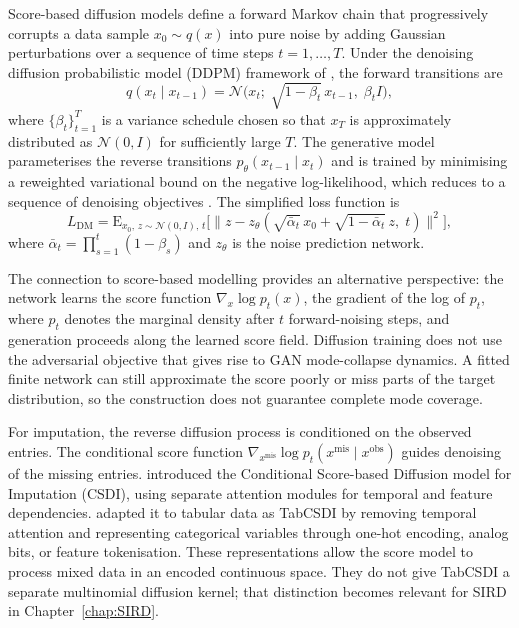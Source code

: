 Score-based diffusion models \citep{sohl-dickstein2015deep, song2020score} define a forward Markov chain that progressively corrupts a data sample $x_0 \sim q(x)$ into pure noise by adding Gaussian perturbations over a sequence of time steps $t = 1, \ldots, T$. Under the denoising diffusion probabilistic model (DDPM) framework of \citet{ho2020denoising}, the forward transitions are
\begin{equation}
    q(x_t \mid x_{t-1})
    = \mathcal{N}\bigl(x_t;\; \sqrt{1 - \beta_t}\, x_{t-1},\;
      \beta_t I\bigr),
    \label{eq:ddpm_forward}
\end{equation}
where $\{\beta_t\}_{t=1}^T$ is a variance schedule chosen so that $x_T$ is approximately distributed as $\mathcal{N}(0, I)$ for sufficiently large $T$. The generative model parameterises the reverse transitions $p_{\theta}(x_{t-1} \mid x_t)$ and is trained by minimising a reweighted variational bound on the negative log-likelihood, which reduces to a sequence of denoising objectives \citep{ho2020denoising}. The simplified loss function is
\begin{equation}
    L_{\mathrm{DM}}
    = \mathrm{E}_{x_0,\, z \sim \mathcal{N}(0,I),\, t}
    \bigl[\lVert z - z_{\theta}(\sqrt{\bar{\alpha}_t}\, x_0
    + \sqrt{1 - \bar{\alpha}_t}\, z,\; t) \rVert^2\bigr],
    \label{eq:ddpm_loss}
\end{equation}
where $\bar{\alpha}_t = \prod_{s=1}^{t}(1 - \beta_s)$ and $z_{\theta}$ is the noise prediction network.

The connection to score-based modelling \citep{song2019generative, song2020score} provides an alternative perspective: the network learns the score function $\nabla_x \log p_t(x)$, the gradient of the log of $p_t$, where $p_t$ denotes the marginal density after $t$ forward-noising steps, and generation proceeds along the learned score field. Diffusion training does not use the adversarial objective that gives rise to GAN mode-collapse dynamics. A fitted finite network can still approximate the score poorly or miss parts of the target distribution, so the construction does not guarantee complete mode coverage.

For imputation, the reverse diffusion process is conditioned on the observed entries. The conditional score function $\nabla_{x^{\mathrm{mis}}} \log p_t(x^{\mathrm{mis}} \mid x^{\mathrm{obs}})$ guides denoising of the missing entries. \citet{tashiro2021csdi} introduced the Conditional Score-based Diffusion model for Imputation (CSDI), using separate attention modules for temporal and feature dependencies. \citet{zheng2022diffusion} adapted it to tabular data as TabCSDI by removing temporal attention and representing categorical variables through one-hot encoding, analog bits, or feature tokenisation. These representations allow the score model to process mixed data in an encoded continuous space. They do not give TabCSDI a separate multinomial diffusion kernel; that distinction becomes relevant for SIRD in Chapter~\ref{chap:SIRD}.

